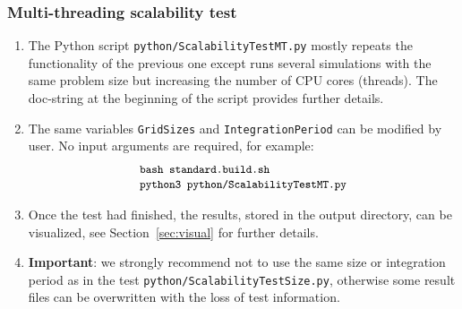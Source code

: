 \documentclass[]{article}
\begin{document}
\subsubsection{Multi-threading scalability test}
\begin{enumerate}
\item The Python script \texttt{python/ScalabilityTestMT.py} mostly repeats the functionality of the previous one except runs several simulations with the same problem size but increasing the number of CPU cores (threads). The doc-string at the beginning of the script provides further details.
\item The same variables \texttt{GridSizes} and \texttt{IntegrationPeriod} can be modified by user. No input arguments are required, for example:
$$
\begin{array}{l}
\mbox{\small\texttt{bash standard.build.sh}} \\
\mbox{\small\texttt{python3 python/ScalabilityTestMT.py}} \\
\end{array}
$$
\item Once the test had finished, the results, stored in the output directory, can be visualized, see Section~\ref{sec:visual} for further details.
\item \textbf{Important}: we strongly recommend not to use the same size or integration period as in the test \texttt{python/ScalabilityTestSize.py}, otherwise some result files can be overwritten with the loss of test information.
\end{enumerate}

\end{document}
